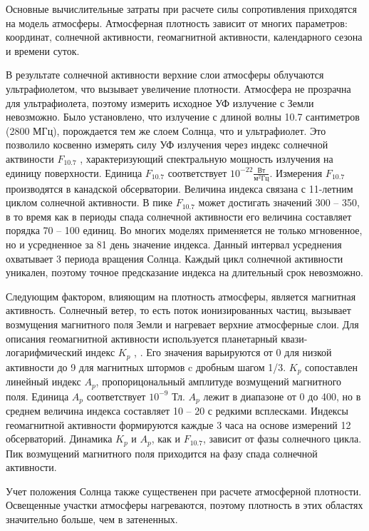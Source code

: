 Основные вычислительные затраты при расчете силы сопротивления приходятся на модель атмосферы.
Атмосферная плотность зависит от многих параметров: координат, солнечной активности,
геомагнитной активности, календарного сезона и времени суток.

В результате солнечной активности верхние слои атмосферы облучаются ультрафиолетом,
что вызывает увеличение плотности. Атмосфера не прозрачна для ультрафиолета,
поэтому измерить исходное УФ излучение с Земли невозможно. Было установлено, что
излучение с длиной волны 10.7 сантиметров (2800 МГц), порождается тем же слоем Солнца, что и
ультрафиолет. Это позволило косвенно измерять силу УФ излучения через индекс
солнечной актвиности $F_{10.7}$ \cite{Tapping2013}, характеризующий спектральную мощность излучения на единицу поверхности. Единица $F_{10.7}$ соответствует
$10^{-22} \frac{\text{Вт}}{\text{м}^2 \text{Гц}}$. 
Измерения $F_{10.7}$ производятся в канадской обсерватории. 
Величина индекса связана с 11-летним циклом солнечной активности. 
В пике $F_{10.7}$ может достигать значений 300 -- 350, в то время как в периоды спада
солнечной активности его величина составляет порядка 70 -- 100 единиц. 
Во многих моделях применяется не только мгновенное, но и усредненное за 81 день значение индекса.
Данный интервал усреднения охватывает 3 периода вращения Солнца. 
Каждый цикл солнечной активности уникален, 
поэтому точное предсказание индекса на длительный срок невозможно.

Следующим фактором, влияющим на плотность атмосферы, является магнитная активность.
Солнечный ветер, то есть поток ионизированных частиц, 
вызывает возмущения магнитного поля Земли и нагревает верхние атмосферные слои.
Для описания геомагнитной активности используется планетарный квази-логарифмический индекс $K_p$
\cite{Bartels1949}, \cite{Matzka2021}.
Его значения варьируются от 0 для низкой активности до 9 для магнитных штормов c дробным шагом 1/3. 
$K_p$ сопоставлен линейный индекс $A_p$, пропорицональный амплитуде возмущений магнитного поля.
Единица $A_p$ соответствует $10^{-9}$ Тл. $A_p$ лежит в диапазоне от 0 до 400, но в среднем величина индекса составляет 10 -- 20 с редкими всплесками.
Индексы геомагнитной активности формируются каждые 3 часа на основе измерений 12 обсерваторий.
Динамика $K_p$ и $A_p$, как и $F_{10.7}$, зависит от фазы солнечного цикла.
Пик возмущений магнитного поля приходится на фазу спада солнечной активности.

Учет положения Солнца также существенен при расчете атмосферной плотности.
Освещенные участки атмосферы нагреваются, поэтому плотность в этих областях значительно
больше, чем в затененных.

